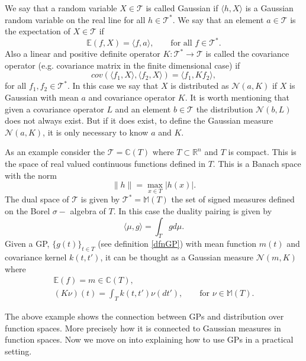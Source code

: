 \documentclass{article}
\newcommand{\E}{\mathbb{E}}
\newcommand{\tvs}{\mathscr{T}}
\begin{document}
We say that a random variable $X\in\tvs$ is called Gaussian if $\langle h,X\rangle$ is
a Gaussian random variable on the real line for all $h\in\tvs^{*}$. We say that an element $a\in\tvs$ is the 
expectation of $X\in\tvs$ if 
\begin{equation*}
\E(f,X)=\langle f, a\rangle,\qquad\text{for all }f\in\tvs^{*}.
\end{equation*}
Also a linear and positive definite operator $K:\tvs^{*}\longrightarrow \tvs$ 
is called the covariance operator (e.g. covariance
matrix in the finite dimensional case) if
\begin{equation*}
cov(\langle f_{1},X\rangle,\langle f_{2},X\rangle)=\langle f_{1},Kf_{2}\rangle,
\end{equation*}
for all $f_{1},f_{2}\in\tvs^{*}$. In this case we say that $X$ is distributed as 
$\mathcal{N}(a,K)$ if  $X$ is Gaussian with mean $a$ and covariance operator $K$. It is worth mentioning
that given a covariance operator $L$ and an element $b\in\tvs$ the distribution $\mathcal{N}(b,L)$
does not always exist. But if it does exist, to define the  Gaussian measure $\mathcal{N}(a,K)$, it is
only necessary to know $a$ and $K$.
\newline

As an example consider the  $\tvs=\mathbb{C}(T)$ where 
$T\subset\mathbb{R}^{n}$ and $T$ is compact. This is the  space of real valued continuous functions 
defined in 
$T$. This  is a Banach
space with the norm \cite{bressan1900lecture}
\begin{equation*}
\|h\|=\max_{x\in T}|h(x)|.
\end{equation*}
The dual space of $\tvs$ is given by $\tvs^{*}=\mathbb{M}(T)$ the set of signed measures defined on 
the Borel $\sigma-$ algebra of  $T$. In this 
case the duality pairing is given by 
\begin{equation*}
\langle\mu,g \rangle=\int_{T}gd\mu.
\end{equation*}
Given a GP,  $\{g(t)\}_{t\in T}$ (see definition \ref{dfnGP}) with mean function $m(t)$ and 
covariance kernel $k(t,t')$, it can be thought as a Gaussian measure $\mathcal{N}(m,K)$
where
\cite{lifshits2012lectures} 
\begin{eqnarray*}
\E(f)=m\in\mathbb{C}(T), \\
(K\nu)(t)=\int_{T}k(t,t')\nu(dt'),\qquad\text{for }\nu\in\mathbb{M}(T).
\end{eqnarray*}

The above example shows the connection between GPs and distribution over function spaces. More
precisely how it is connected to Gaussian measures in function spaces. Now we move on
into explaining how to use GPs in a practical setting.
\end{document}
